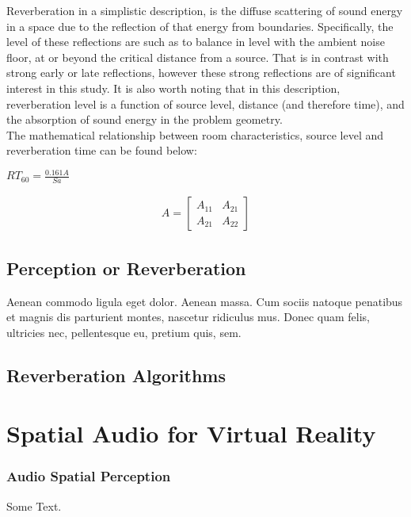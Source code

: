 \documentclass[paper=a4, fontsize=11pt]{scrartcl} %
\numberwithin{equation}{section} %
\numberwithin{figure}{section} %
\numberwithin{table}{section} %
\begin{document}
Reverberation in a simplistic description, is the diffuse scattering of sound energy in a space due to the reflection of that energy from boundaries. Specifically, the level of these reflections are such as to balance in level with the ambient noise floor, at or beyond the critical distance from a source. That is in contrast with strong early or late reflections, however these strong reflections are of significant interest in this study. It is also worth noting that in this description, reverberation level is a function of source level, distance (and therefore time), and the absorption of sound energy in the problem geometry.\\
The mathematical relationship between room characteristics, source level and reverberation time can be found below:\\
\begin{center}
$RT_{60} = \frac{0.161 A}{Sa}$
\end{center}



\begin{align}
A = 
\begin{bmatrix}
A_{11} & A_{21} \\
A_{21} & A_{22}
\end{bmatrix}
\end{align}

\subsection{Perception or Reverberation}
Aenean commodo ligula eget dolor. Aenean massa. Cum sociis natoque penatibus et magnis dis parturient montes, nascetur ridiculus mus. Donec quam felis, ultricies nec, pellentesque eu, pretium quis, sem.
\subsection{Reverberation Algorithms}

\section{Spatial Audio for Virtual Reality}
\subsubsection{Audio Spatial Perception}

Some Text.\\
\end{document}

